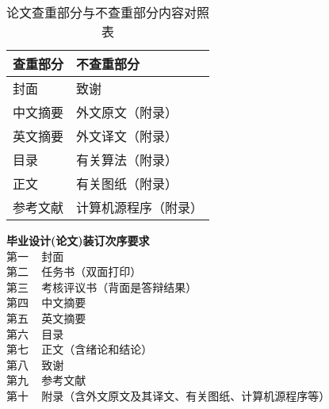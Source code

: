 \begin{table}[!h]
	\renewcommand{\arraystretch}{1.2}
	\centering\wuhao
	\caption{论文查重部分与不查重部分内容对照表} \label{tab_check} \vspace{2mm}
	\begin{tabularx}{\textwidth} { >{\centering\arraybackslash}X >{\centering\arraybackslash}X }
	\toprule[1.5pt]
		查重部分 & 不查重部分 \\
	\midrule[1pt]
		封面        &   致谢                \\
		中文摘要    &   外文原文（附录）    \\
		英文摘要    &   外文译文（附录）    \\
		目录        &   有关算法（附录）    \\
		正文        &   有关图纸（附录）    \\
		参考文献    &   计算机源程序（附录）\\    
	\bottomrule[1.5pt]
	\end{tabularx}
\end{table}

\noindent \textbf{毕业设计(论文)装订次序要求} \\
第一 ~ 封面 \\
第二 ~ 任务书（双面打印） \\
第三 ~ 考核评议书（背面是答辩结果） \\
第四 ~ 中文摘要 \\
第五 ~ 英文摘要 \\
第六 ~ 目录 \\
第七 ~ 正文（含绪论和结论） \\
第八 ~ 致谢 \\
第九 ~ 参考文献 \\
第十 ~ 附录（含外文原文及其译文、有关图纸、计算机源程序等）